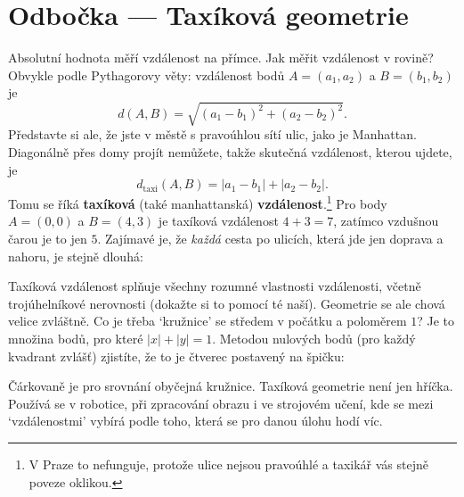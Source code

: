 \section{Odbočka --- Taxíková geometrie}

Absolutní hodnota měří vzdálenost na přímce. Jak měřit vzdálenost v rovině? Obvykle podle Pythagorovy věty: vzdálenost bodů $A = (a_1, a_2)$ a $B = (b_1, b_2)$ je
\begin{equation*}
  d(A, B) = \sqrt{{(a_1 - b_1)}^2 + {(a_2 - b_2)}^2}.
\end{equation*}
Představte si ale, že jste v městě s pravoúhlou sítí ulic, jako je Manhattan. Diagonálně přes domy projít nemůžete, takže skutečná vzdálenost, kterou ujdete, je
\begin{equation*}
  d_{\text{taxi}}(A, B) = |a_1 - b_1| + |a_2 - b_2|.
\end{equation*}
Tomu se říká \textbf{taxíková} (také manhattanská) \textbf{vzdálenost}.\footnote{V Praze to nefunguje, protože ulice nejsou pravoúhlé a taxikář vás stejně poveze oklikou.} Pro body $A = (0, 0)$ a $B = (4, 3)$ je taxíková vzdálenost $4 + 3 = 7$, zatímco vzdušnou čarou je to jen $5$. Zajímavé je, že \textit{každá} cesta po ulicích, která jde jen doprava a nahoru, je stejně dlouhá:
\begin{center}
\end{center}
Taxíková vzdálenost splňuje všechny rozumné vlastnosti vzdálenosti, včetně trojúhelníkové nerovnosti (dokažte si to pomocí té naší). Geometrie se ale chová velice zvláštně. Co je třeba `kružnice' se středem v počátku a poloměrem $1$? Je to množina bodů, pro které $|x| + |y| = 1$. Metodou nulových bodů (pro každý kvadrant zvlášť) zjistíte, že to je čtverec postavený na špičku:
\begin{center}
\end{center}
Čárkovaně je pro srovnání obyčejná kružnice. Taxíková geometrie není jen hříčka. Používá se v robotice, při zpracování obrazu i ve strojovém učení, kde se mezi `vzdálenostmi' vybírá podle toho, která se pro danou úlohu hodí víc.

